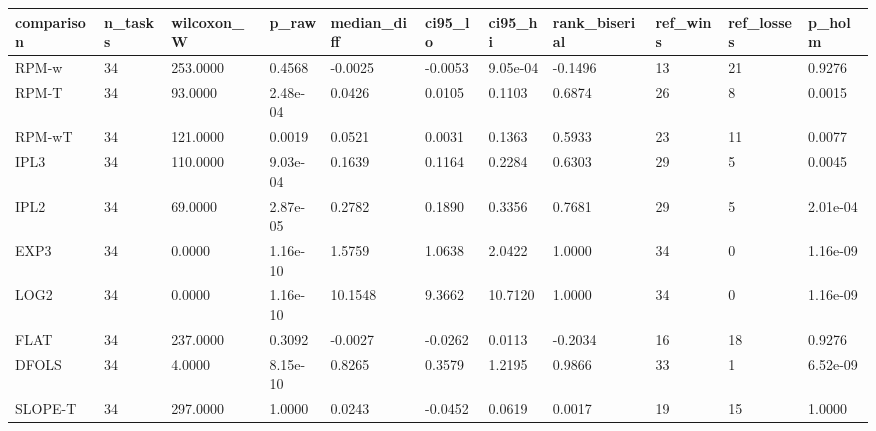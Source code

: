 \begin{tabular}{lllllllllll}
\hline
comparison & n\_tasks & wilcoxon\_W & p\_raw & median\_diff & ci95\_lo & ci95\_hi & rank\_biserial & ref\_wins & ref\_losses & p\_holm \\
\hline
RPM-w & 34 & 253.0000 & 0.4568 & -0.0025 & -0.0053 & 9.05e-04 & -0.1496 & 13 & 21 & 0.9276 \\
RPM-T & 34 & 93.0000 & 2.48e-04 & 0.0426 & 0.0105 & 0.1103 & 0.6874 & 26 & 8 & 0.0015 \\
RPM-wT & 34 & 121.0000 & 0.0019 & 0.0521 & 0.0031 & 0.1363 & 0.5933 & 23 & 11 & 0.0077 \\
IPL3 & 34 & 110.0000 & 9.03e-04 & 0.1639 & 0.1164 & 0.2284 & 0.6303 & 29 & 5 & 0.0045 \\
IPL2 & 34 & 69.0000 & 2.87e-05 & 0.2782 & 0.1890 & 0.3356 & 0.7681 & 29 & 5 & 2.01e-04 \\
EXP3 & 34 & 0.0000 & 1.16e-10 & 1.5759 & 1.0638 & 2.0422 & 1.0000 & 34 & 0 & 1.16e-09 \\
LOG2 & 34 & 0.0000 & 1.16e-10 & 10.1548 & 9.3662 & 10.7120 & 1.0000 & 34 & 0 & 1.16e-09 \\
FLAT & 34 & 237.0000 & 0.3092 & -0.0027 & -0.0262 & 0.0113 & -0.2034 & 16 & 18 & 0.9276 \\
DFOLS & 34 & 4.0000 & 8.15e-10 & 0.8265 & 0.3579 & 1.2195 & 0.9866 & 33 & 1 & 6.52e-09 \\
SLOPE-T & 34 & 297.0000 & 1.0000 & 0.0243 & -0.0452 & 0.0619 & 0.0017 & 19 & 15 & 1.0000 \\
\hline
\end{tabular}
